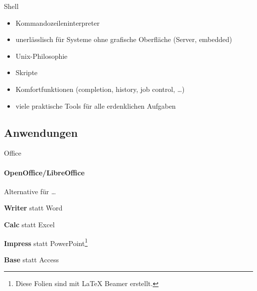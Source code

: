\documentclass{beamer}
\makeatletter
\newcommand{\strong}[1]{\@strong{#1}}
\newcommand{\@@strong}[1]{\textbf{\let\@strong\@@@strong#1}}
\newcommand{\@@@strong}[1]{\textnormal{\let\@strong\@@strong#1}}
\let\@strong\@@strong
\makeatother
\begin{document}
\begin{frame}{Shell}
    \begin{itemize}
        \item Kommandozeileninterpreter
        \item unerlässlisch für Systeme ohne grafische Oberfläche
            (Server, embedded)
        \item Unix-Philosophie
        \item Skripte
        \item Komfortfunktionen (completion, history, job control, …)
        \item viele praktische Tools für alle erdenklichen Aufgaben
    \end{itemize}
\end{frame}

\subsection{Anwendungen}

\begin{frame}{Office}
    \framesubtitle{OpenOffice/LibreOffice}
    {
    }
    {
        \begin{block}{Alternative für …}
            \begin{description}[Tabellenkalkulation]
                \item[Textverarbeitung] \strong{Writer} statt Word
                \item[Tabellenkalkulation] \strong{Calc} statt Excel
                \item[Präsentation] \strong{Impress} statt
                    PowerPoint\footnote{Diese Folien sind mit \LaTeX
                    Beamer erstellt.}
                \item[Datenbank] \strong{Base} statt Access
            \end{description}
        \end{block}
    }
\end{frame}
\end{document}

